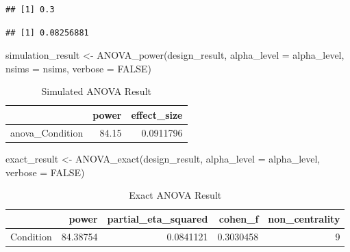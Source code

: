 \documentclass[
]{book}
\newenvironment{Shaded}{\begin{snugshade}}{\end{snugshade}}
\newcommand{\AttributeTok}[1]{\textcolor[rgb]{0.77,0.63,0.00}{#1}}
\newcommand{\ConstantTok}[1]{\textcolor[rgb]{0.00,0.00,0.00}{#1}}
\newcommand{\FunctionTok}[1]{\textcolor[rgb]{0.00,0.00,0.00}{#1}}
\newcommand{\NormalTok}[1]{#1}
\newcommand{\OtherTok}[1]{\textcolor[rgb]{0.56,0.35,0.01}{#1}}
\newcommand{\SpecialCharTok}[1]{\textcolor[rgb]{0.00,0.00,0.00}{#1}}
\begin{document}
\begin{verbatim}
## [1] 0.3
\end{verbatim}

\begin{Shaded}
\end{Shaded}

\begin{verbatim}
## [1] 0.08256881
\end{verbatim}

\begin{Shaded}
\begin{Highlighting}[]
\NormalTok{simulation\_result }\OtherTok{\textless{}{-}} \FunctionTok{ANOVA\_power}\NormalTok{(design\_result, }
                                 \AttributeTok{alpha\_level =}\NormalTok{ alpha\_level, }
                                 \AttributeTok{nsims =}\NormalTok{ nsims,}
                                 \AttributeTok{verbose =} \ConstantTok{FALSE}\NormalTok{)}
\end{Highlighting}
\end{Shaded}

\begin{table}[!h]

\caption{\label{tab:unnamed-chunk-239}Simulated ANOVA Result}
\centering
\begin{tabular}[t]{l|r|r}
\hline
  & power & effect\_size\\
\hline
anova\_Condition & 84.15 & 0.0911796\\
\hline
\end{tabular}
\end{table}

\begin{Shaded}
\begin{Highlighting}[]
\NormalTok{exact\_result }\OtherTok{\textless{}{-}} \FunctionTok{ANOVA\_exact}\NormalTok{(design\_result,}
                            \AttributeTok{alpha\_level =}\NormalTok{ alpha\_level,}
                            \AttributeTok{verbose =} \ConstantTok{FALSE}\NormalTok{)}
\end{Highlighting}
\end{Shaded}

\begin{table}[!h]

\caption{\label{tab:unnamed-chunk-241}Exact ANOVA Result}
\centering
\begin{tabular}[t]{l|r|r|r|r}
\hline
  & power & partial\_eta\_squared & cohen\_f & non\_centrality\\
\hline
Condition & 84.38754 & 0.0841121 & 0.3030458 & 9\\
\hline
\end{tabular}
\end{table}
\end{document}
